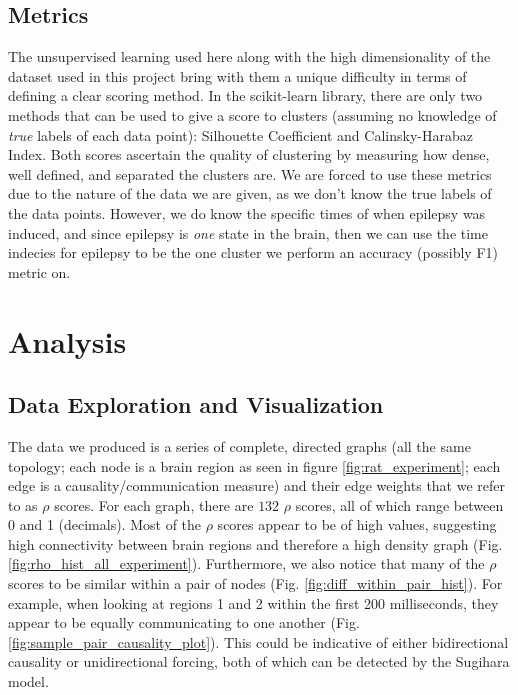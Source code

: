 \documentclass[journal,12pt,onecolumn,draftclsnofoot]{IEEEtran}  %
\begin{document}

\subsection{Metrics}
The unsupervised learning used here along with the high dimensionality of the dataset used in this project bring with them a unique difficulty in terms of defining a clear scoring method. In the scikit-learn library, there are only two methods that can be used to give a score to clusters (assuming no knowledge of \textit{true} labels of each data point): Silhouette Coefficient and Calinsky-Harabaz Index. Both scores ascertain the quality of clustering by measuring how dense, well defined, and separated the clusters are. We are forced to use these metrics due to the nature of the data we are given, as we don't know the true labels of the data points. However, we do know the specific times of when epilepsy was induced, and since epilepsy is \textit{one} state in the brain, then we can use the time indecies for epilepsy to be the one cluster we perform an accuracy (possibly F1) metric on.

\section{Analysis}

\subsection{Data Exploration and Visualization}
The data we produced is a series of complete, directed graphs (all the same topology; each node is a brain region as seen in figure \ref{fig:rat_experiment}; each edge is a causality/communication measure) and their edge weights that we refer to as $\rho$ scores. For each graph, there are $132$ $\rho$ scores, all of which range between 0 and 1 (decimals). Most of the $\rho$ scores appear to be of high values, suggesting high connectivity between brain regions and therefore a high density graph (Fig. \ref{fig:rho_hist_all_experiment}). Furthermore, we also notice that many of the $\rho$ scores to be similar within a pair of nodes (Fig. \ref{fig:diff_within_pair_hist}). For example, when looking at regions 1 and 2 within the first 200 milliseconds, they appear to be equally communicating to one another (Fig. \ref{fig:sample_pair_causality_plot}). This could be indicative of either bidirectional causality or unidirectional forcing, both of which can be detected by the Sugihara model.
\end{document}
